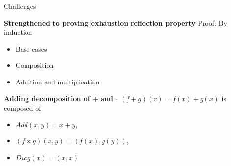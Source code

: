 \begin{frame}{Challenges}
\begin{minipage}[t]{0.44\linewidth}
\begin{exampleblock}{\textbf{\textcolor{BrickRed}{Strengthened to proving \textbf{exhaustion reflection property}}}}
            \pause
            Proof: By induction 
            \vspace{-0.5em}
            \begin{itemize}
                \setlength\itemsep{-5pt}
                \pause\item Base cases \Checkmark
                \pause\item Composition \Checkmark 
                \pause \item Addition and multiplication \textcolor{Mahogany}{\XSolidBrush}
            \end{itemize}
        \end{exampleblock}
        \vspace{-1em} \pause
        \begin{exampleblock}{\textbf{\textcolor{OliveGreen}{Adding decomposition of $+$ and $\cdot$}}}
        $(f+g)(x) = f(x)+g(x)$ is composed of
        \begin{itemize}
            \setlength\itemsep{-1pt}
            \item $\mathit{Add}(x,y) = x + y$,
            \item $(f\times g)(x,y) = (f(x),g(y))$, 
            \item $\mathit{Diag}(x) = (x,x) \qquad$  \Checkmark \Checkmark
        \end{itemize}
        \end{exampleblock}
    \end{minipage}
    \note[itemize]{
}
\end{frame}

